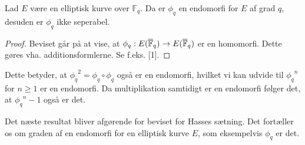 \begin{lemma}
Lad $E$ være en elliptisk kurve over $\mathbb{F}_q$. Da er $\phi_q$ en 
endomorfi for $E$ af grad $q$, desuden er $\phi_q$ ikke seperabel.
\end{lemma}
\begin{proof}
Beviset går på at vise, at $\phi_q : E(\overline{\mathbb{F}}_q) \to E(\overline{\mathbb{F}}_q)$ er en homomorfi. 
Dette gøres vha. additionsformlerne. Se f.eks. [1].
\end{proof}

Dette betyder, at ${\phi_q}^2 = \phi_q \circ \phi_q$ også er en endomorfi,
hvilket vi kan udvide til ${\phi_q}^n$ for $n \geq 1$ er en endomorfi. 
Da multiplikation samtidigt er en endomorfi følger det, at ${\phi_q}^n -1$ 
også er det. 

Det næste resultat bliver afgørende for beviset for Hasses sætning. 
Det fortæller os om graden af en endomorfi for en elliptisk kurve $E$,
som eksempelvis $\phi_q$ er det.

